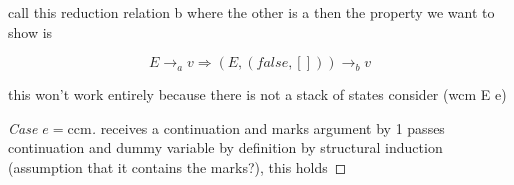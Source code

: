 \documentclass[ms,electronic,twosidetoc,letterpaper,chaptercenter,parttop]{byumsphd}
\begin{document}
call this reduction relation b where the other is a
then the property we want to show is

\[
E\rightarrow_{a}v\Rightarrow(E,(false,[]))\rightarrow_{b}v
\]

this won't work entirely because there is not a stack of states
consider (wcm E e)












\begin{proof}[Case $e=\mathrm{ccm}$]
receives a continuation and marks argument by 1
passes continuation and dummy variable by definition
by structural induction (assumption that it contains the marks?), this holds
\end{proof}










 
\end{document}
